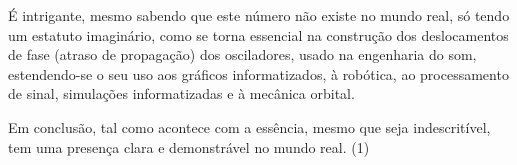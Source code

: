 É intrigante, mesmo sabendo que este número não existe no mundo real, só
tendo um estatuto imaginário, como se torna essencial na construção dos
deslocamentos de fase (atraso de propagação) dos osciladores, usado na
engenharia do som, estendendo-se o seu uso aos gráficos informatizados,
à robótica, ao processamento de sinal, simulações informatizadas e à
mecânica orbital.

Em conclusão, tal como acontece com a essência, mesmo que seja
indescritível, tem uma presença clara e demonstrável no mundo real. (1)


